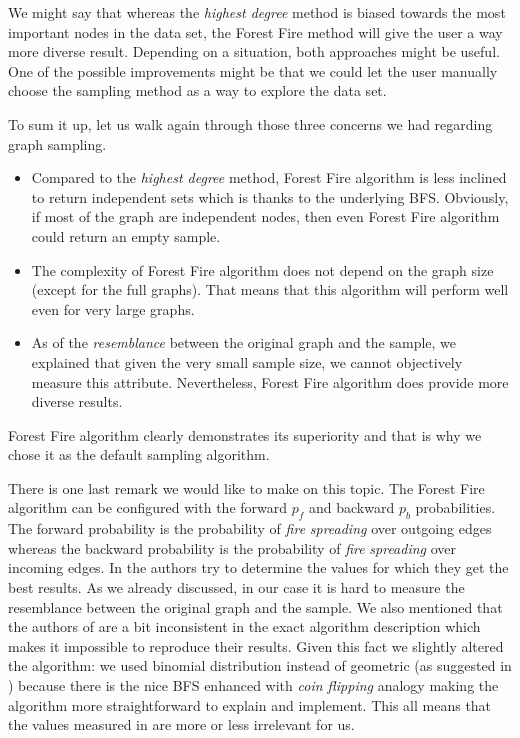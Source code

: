 We might say that whereas the \emph{highest degree} method is biased towards the most important nodes in the data set, the Forest Fire method will give the user a way more diverse result. Depending on a situation, both approaches might be useful. One of the possible improvements might be that we could let the user manually choose the sampling method as a way to explore the data set.

To sum it up, let us walk again through those three concerns we had regarding graph sampling.

\begin{itemize}
\item Compared to the \emph{highest degree} method, Forest Fire algorithm is less inclined to return independent sets which is thanks to the underlying BFS. Obviously, if most of the graph are independent nodes, then even Forest Fire algorithm could return an empty sample.
\item The complexity of Forest Fire algorithm does not depend on the graph size (except for the full graphs). That means that this algorithm will perform well even for very large graphs.
\item As of the \emph{resemblance} between the original graph and the sample, we explained that given the very small sample size, we cannot objectively measure this attribute. Nevertheless, Forest Fire algorithm does provide more diverse results.
\end{itemize}

Forest Fire algorithm clearly demonstrates its superiority and that is why we chose it as the default sampling algorithm.

There is one last remark we would like to make on this topic. The Forest Fire algorithm can be configured with the forward $p_f$ and backward $p_b$ probabilities. The forward probability is the probability of \emph{fire} \emph{spreading} over outgoing edges whereas the backward probability is the probability of \emph{fire} \emph{spreading} over incoming edges. In \cite{leskovec2006sampling} the authors try to determine the values for which they get the best results. As we already discussed, in our case it is hard to measure the resemblance between the original graph and the sample. We also mentioned that the authors of \cite{leskovec2006sampling} are a bit inconsistent in the exact algorithm description which makes it impossible to reproduce their results. Given this fact we slightly altered the algorithm: we used binomial distribution instead of geometric (as suggested in \cite{leskovec2005graphs}) because there is the nice BFS enhanced with \emph{coin flipping} analogy making the algorithm more straightforward to explain and implement. This all means that the values measured in \cite{leskovec2006sampling} are more or less irrelevant for us.


